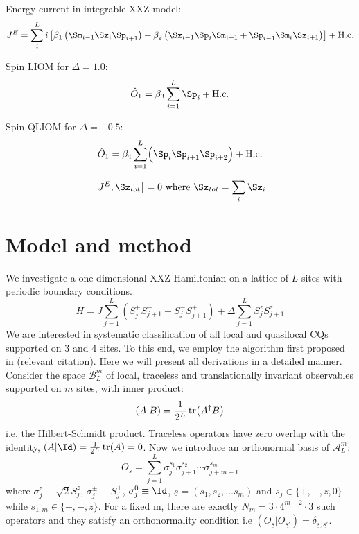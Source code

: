 \noindent Energy current in integrable XXZ model: 
\begin{align}
    J^E = \sum_i^L i\left[\beta_1 \left(\Sm_{i-1}\Sz_{i}\Sp_{i+1}\right) + \beta_2 \left(\Sz_{i-1}\Sp_{i}\Sm_{i+1}+\Sp_{i-1}\Sm_{i}\Sz_{i+1}\right)\right] + \text{H.c.}
\end{align}


\noindent Spin LIOM for \(\Delta=1.0\):
\begin{equation}
    \hat{O}_{1} =  \beta_3\sum_{i=1}^{L} \Sp_{i} + \text{H.c.}
\end{equation}

\noindent Spin QLIOM for \(\Delta=-0.5\):
\begin{equation}
    \hat{O}_{1} =\beta_4 \sum_{i=1}^{L} \Bigl( \Sp_{i}\Sp_{i+1}\Sp_{i+2}\Bigr) + \text{H.c.}
\end{equation}

\begin{equation*}
    \comm{J^E}{\Sz_{tot}} = 0 \text{   where   } \Sz_{tot} = \sum_i \Sz_i
  \end{equation*}
  
  \section{Model and method}
  
  We investigate a one dimensional XXZ Hamiltonian on a lattice of \(L\) sites with periodic boundary conditions.
  \begin{equation}
      H = J\sum_{j = 1}^{L}\left( S^{+}_{j} S^{-}_{j+1} + S^{-}_{j}S^{+}_{j+1} \right) + \Delta\sum_{j = 1}^{L} S^{z}_{j}S^{z}_{j+1}
  \end{equation}
  We are interested in systematic classification of all local and quasilocal CQs supported on 3 and 4 sites. To this end, 
  we employ the algorithm first proposed in (relevant citation). Here we will present all derivations in a detailed manner.
  Consider the space \(\mathcal{B}_L^m\) of local, traceless and translationally invariant observables supported on \(m\) sites, with inner product:
  \begin{equation}
      \left(A|B\right) = \frac{1}{2^L}\tr(A^{\dagger}B)
  \end{equation}
  i.e. the Hilbert-Schmidt product. Traceless operators have zero overlap with the identity, \(\left(A|\Id\right)=\frac{1}{2^L}\tr(A) = 0\).
  Now we introduce an orthonormal basis of \({\mathcal{A}_L^m}\):
  \begin{equation}
      O_{\underline{s} } = \sum_{j = 1}^L \sigma_{j}^{s_1}\sigma_{j+1}^{s_2}\cdots \sigma_{j+m-1}^{s_m}
  \end{equation}
  where \(\sigma^z_j \equiv \sqrt{2}S^{z}_j\), \(\sigma^{\pm}_j \equiv S^{\pm}_j\), \(\sigma^0_j\equiv \Id\), \(\underline{s} = (s_1,s_2,\ldots s_m)\)
  and \(s_j \in \{+,-,z,0\}\) while \(s_{1,m} \in \{+,-,z\}\). For a fixed m, there are exactly \(N_m = 3\cdot 4^{m-2}\cdot 3\) such operators and they
  satisfy an orthonormality condition i.e \(\left(O_{\underline{s}}|O_{\underline{s'}}\right) = \delta_{\underline{s},\underline{s'}}\). 
  
